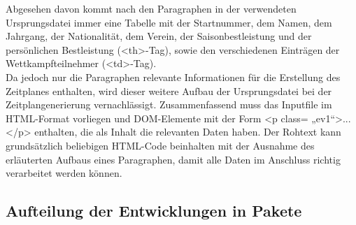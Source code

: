 Abgesehen davon kommt nach den Paragraphen in der verwendeten Ursprungsdatei immer eine Tabelle mit der Startnummer, dem Namen, dem Jahrgang, der Nationalität, dem Verein, der Saisonbestleistung und der persönlichen Bestleistung (<th>-Tag), sowie den verschiedenen Einträgen der Wettkampfteilnehmer (<td>-Tag). \\
Da jedoch nur die Paragraphen relevante Informationen für die Erstellung des Zeitplanes enthalten, wird dieser weitere Aufbau der Ursprungsdatei bei der Zeitplangenerierung vernachlässigt. 
Zusammenfassend muss das Inputfile im HTML-Format vorliegen und DOM-Elemente mit der Form <p class= „ev1“>...</p> enthalten, die als Inhalt die relevanten Daten haben. Der Rohtext kann grundsätzlich beliebigen HTML-Code beinhalten mit der Ausnahme des erläuterten Aufbaus eines Paragraphen, damit alle Daten im Anschluss richtig verarbeitet werden können.  

\subsection{Aufteilung der Entwicklungen in Pakete}

